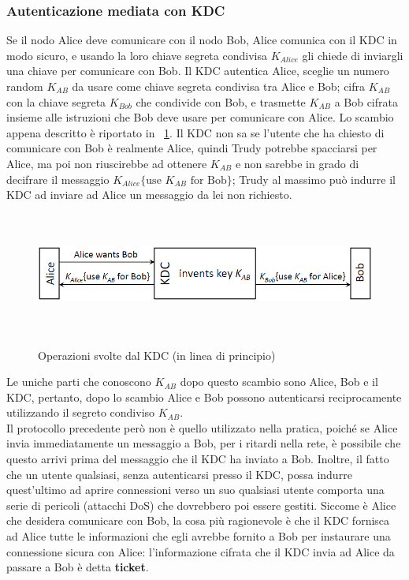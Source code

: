 \subsubsection{Autenticazione mediata con KDC}
Se il nodo Alice deve comunicare con il nodo Bob, Alice comunica con il KDC in modo sicuro, e usando la loro chiave segreta condivisa $K_{Alice}$ gli chiede di inviargli una chiave per comunicare con Bob. Il KDC autentica Alice, sceglie un numero random $K_{AB}$ da usare come chiave segreta condivisa tra Alice e Bob; cifra $K_{AB}$ con la chiave segreta $K_{Bob}$ che condivide con Bob, e trasmette $K_{AB}$ a Bob cifrata insieme alle istruzioni che Bob deve usare per comunicare con Alice. Lo scambio appena descritto è riportato in \figurename~\ref{fig:ImgS94bis}. Il KDC non sa se l'utente che ha chiesto di comunicare con Bob è realmente Alice, quindi Trudy potrebbe spacciarsi per Alice, ma poi non riuscirebbe ad ottenere $K_{AB}$ e non sarebbe in grado di decifrare il messaggio $K_{Alice}\lbrace \text{use } K_{AB} \text{ for Bob} \rbrace$; Trudy al massimo può indurre il KDC ad inviare ad Alice un messaggio da lei non richiesto.
\begin{figure}[htbp]
	\centering%
	\subfigure%
	{\includegraphics[height=4cm, width=12cm, keepaspectratio]{Immagini/autenticazione/ImgS94bis.png}}
	\caption{Operazioni svolte dal KDC (in linea di principio)}\label{fig:ImgS94bis} 	
\end{figure}
Le uniche parti che conoscono $K_{AB}$ dopo questo scambio sono Alice, Bob e il KDC, pertanto, dopo lo scambio Alice e Bob possono autenticarsi reciprocamente utilizzando il segreto condiviso $K_{AB}$. \\
Il protocollo precedente però non è quello utilizzato nella pratica, poiché se Alice invia immediatamente un messaggio a Bob, per i ritardi nella rete, è possibile che questo arrivi prima del messaggio che il KDC ha inviato a Bob. Inoltre, il fatto che un utente qualsiasi, senza autenticarsi presso il KDC, possa indurre quest'ultimo ad aprire connessioni verso un suo qualsiasi utente comporta una serie di pericoli (attacchi DoS) che dovrebbero poi essere gestiti. Siccome è Alice che desidera comunicare con Bob, la cosa più ragionevole è che il KDC fornisca ad Alice tutte le informazioni che egli avrebbe fornito a Bob per instaurare una connessione sicura con Alice: l'informazione cifrata che il KDC invia ad Alice da passare a Bob è detta \textbf{ticket}.

